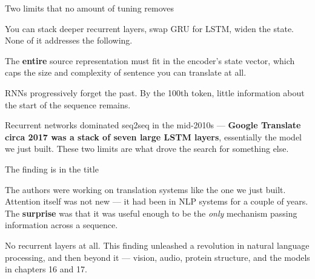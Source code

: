\documentclass[aspectratio=169,11pt,t]{beamer}
\begin{document}
\begin{frame}[shrink=25]{Two limits that no amount of tuning removes}
{\fontsize{9.4}{12.6}\selectfont\color{fg2}You can stack deeper recurrent layers, swap GRU for LSTM, widen the state. None of it addresses the following.\par}\vskip 4pt
\begin{minipage}[t]{0.494\textwidth}
\begin{icardbad}
The \textbf{entire} source representation must fit in the encoder's state vector, which caps the size and complexity of sentence you can translate at all.
\end{icardbad}
\end{minipage}%
\hfill
\begin{minipage}[t]{0.494\textwidth}
\begin{icardbad}
RNNs progressively forget the past. By the 100th token, little information about the start of the sequence remains.
\end{icardbad}
\end{minipage}%
{\fontsize{9.4}{12.6}\selectfont\color{fg2}Recurrent networks dominated seq2seq in the mid-2010s --- \textbf{Google Translate circa 2017 was a stack of seven large LSTM layers}, essentially the model we just built. These two limits are what drove the search for something else.\par}\vskip 4pt
\end{frame}


\begin{frame}[shrink=25]{The finding is in the title}
\begin{iquote}
\end{iquote}
{\fontsize{9.4}{12.6}\selectfont\color{fg2}The authors were working on translation systems like the one we just built. Attention itself was not new --- it had been in NLP systems for a couple of years. The \textbf{surprise} was that it was useful enough to be the \textit{only} mechanism passing information across a sequence.\par}\vskip 4pt
{\fontsize{9.4}{12.6}\selectfont\color{fg2}No recurrent layers at all. This finding unleashed a revolution in natural language processing, and then beyond it --- vision, audio, protein structure, and the models in chapters 16 and 17.\par}\vskip 4pt
\end{frame}
\end{document}
